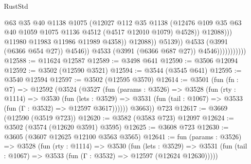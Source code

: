 \begin{lexlean}{RustStd}
\begin{coremodule}
                                                @63
                                                @35
                                                @40
                                                @1138
                                                @1075
                                                (@12027
                                                  @112
                                                  @35
                                                  @1138
                                                  (@12476
                                                    @109
                                                    @35
                                                    @63
                                                    @40
                                                    @1059
                                                    @1075
                                                    @1136
                                                    @4512
                                                    (@4517 @12010 @1079)
                                                    @4528))
                                                @12088)))
                                          @11980
                                          @11983
                                          @11986
                                          @11989
                                          @4358))
                                      @12088))
                                  @5139))
                              @4533
                              (@3991 (@6366 @654 @27))
                              @4546))
                          @4533
                          (@3991 (@6366 @687 @27))
                          @4546)))))))))))
@12588 := @11624 @12587
@12589 := @3498 @641
@12590 := @3506 @12094
@12592 := @3502 (@12590 @3521)
@12594 := @3544 (@3545 @641)
@12595 := @3540 @12594
@12597 := @3502 (@12595 @3570)
@12614 := @3501
    (fun (fn : @7) =>
    @12592
      (@3524
        (@3527
          (fun (params : @3526) =>
          @3528
            (fun (rty : @1114) =>
            @3530
              (fun (lets : @3529) =>
              @3531 (fun (tail : @1067) => @3533 (fun (Γ : @3532) => @12597 @3617))))))
        @3663))
    @723
@12617 := @3669 (@12590 (@3519 @723))
@12620 := @3582 (@3583 @723) @12097
@12624 := @3502 (@3574 (@12620 @3591) @3595)
@12625 := @3608 @723
@12630 := @3605 (@3607 @12625 @12100 @3563 @3565)
@12641 := fun (params : @3526) =>
  @3528
    (fun (rty : @1114) =>
    @3530
      (fun (lets : @3529) =>
      @3531 (fun (tail : @1067) => @3533 (fun (Γ : @3532) => @12597 (@12624 @12630)))))

\end{coremodule}
\end{lexlean}
